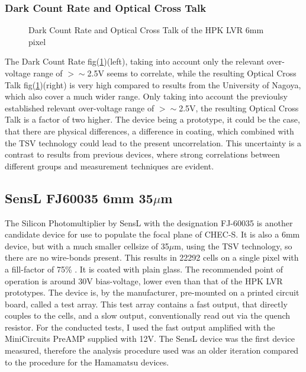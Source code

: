 \documentclass[12pt,article,type=msc,colorback,accentcolor=tud9c]{tudthesis}
\begin{document}
\subsubsection{Dark Count Rate and Optical Cross Talk}
\label{subsubsec:LVR6DCROCT}
\begin{figure}[h]
\begin{centering}
\caption[LCT5 LVR 6mm DCR and OCT]{Dark Count Rate and Optical Cross Talk of the HPK LVR 6mm pixel}
\label{fig:LVR6_DCROCT}
\end{centering}
\end{figure}
The Dark Count Rate fig(\ref{fig:LVR6_DCROCT})(left), taking into account only the relevant over-voltage range of $>\sim$2.5V seems to correlate, while the resulting Optical Cross Talk fig(\ref{fig:LVR6_DCROCT})(right) is very high compared to results from the University of Nagoya, which also cover a much wider range. Only taking into account the previoulsy established relevant over-voltage range of $>\sim$2.5V, the resulting Optical Cross Talk is a factor of two higher. The device being a prototype, it could be the case, that there are physical differences, a difference in coating, which combined with the TSV technology could lead to the present uncorrelation\cite{Yamamoto}. This uncertainty is a contrast to results from previous devices, where strong correlations between different groups and measurement techniques are evident.



\clearpage
\subsection{SensL FJ60035 6mm 35$\mu$m}
The Silicon Photomultiplier by SensL with the designation FJ-60035 is another candidate device for use to populate the focal plane of CHEC-S. It is also a 6mm device, but with a much smaller cellsize of 35$\mu$m, using the TSV technology, so there are no wire-bonds present. This results in 22292 cells on a single pixel with a fill-factor of 75\% . It is coated with plain glass. The recommended point of operation is around 30V bias-voltage, lower even than that of the HPK LVR prototypes. The device is, by the manufacturer, pre-mounted on a printed circuit board, called a test array. This test array contains a fast output, that directly couples to the cells, and a slow output, conventionally read out via the quench resistor. For the conducted tests, I used the fast output amplified with the MiniCircuits PreAMP supplied with 12V. The SensL device was the first device measured, therefore the analysis procedure used was an older iteration compared to the procedure for the Hamamatsu devices. 
\end{document}
